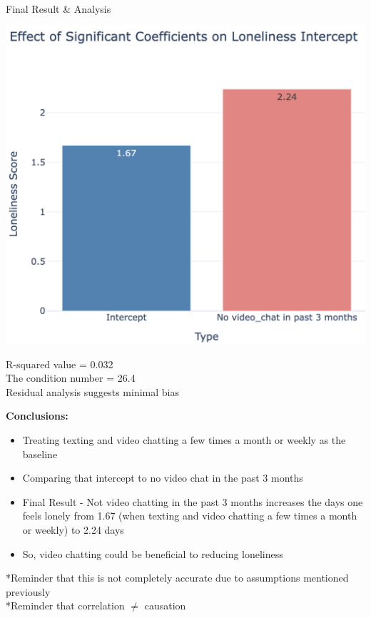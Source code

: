 \documentclass{beamer}
\begin{document}
\begin{frame}{Final Result \& Analysis}

\begin{minipage}[t]{0.6\linewidth} %
    \includegraphics[width=\linewidth]{Screenshot 2024-12-01 at 1.08.25 PM.png}
\end{minipage}%
R-squared value = 0.032\\
The condition number = 26.4\\
Residual analysis suggests minimal bias\\

\end{frame}

\begin{frame}
\textbf{Conclusions:}\\
\begin{itemize}
    \item  Treating texting and video chatting a few times a month or weekly as the baseline
    \item Comparing that intercept to no video chat in the past 3 months
    \item Final Result - Not video chatting in the past 3 months increases the days one feels lonely from 1.67 (when texting and video chatting a few times a month or weekly) to 2.24 days\\
    \item So, video chatting could be beneficial to reducing loneliness 
\end{itemize}

*Reminder that this is not completely accurate due to assumptions mentioned previously\\
*Reminder that correlation $\neq$ causation
\end{frame}
\end{document}
